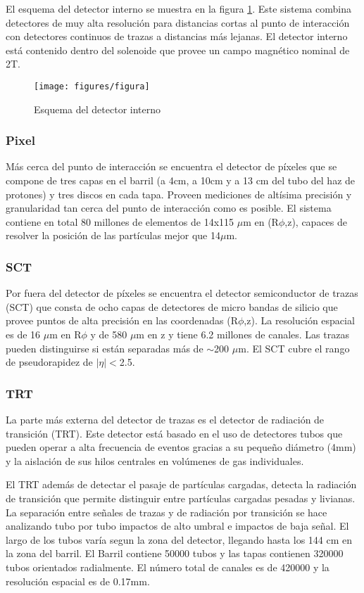 El esquema del detector interno se muestra en la figura \ref{fig:innerdetector}\cite{IDTDR}.
Este sistema combina detectores de muy alta resolución para distancias cortas al punto de interacción con detectores continuos de trazas a distancias más lejanas. El detector interno está contenido dentro del solenoide que provee un campo magnético nominal de 2T.

\begin{figure}[H]
  \centering
  \texttt{[image: figures/figura]}
  \caption{Esquema del detector interno}\label{fig:innerdetector}
\end{figure}

\subsubsection{Pixel}
Más cerca del punto de interacción se encuentra el detector de píxeles que se compone de tres capas en el barril (a 4cm, a 10cm y a 13 cm del tubo del haz de protones) y tres discos en cada tapa.  Proveen mediciones de altísima precisión y granularidad tan cerca del punto de interacción como es posible. El sistema contiene en total 80 millones de elementos de 14x115 $\mu$m en (R$\phi$,z), capaces de resolver la posición de las partículas mejor que 14$\mu$m.

\subsubsection{SCT}
Por fuera del detector de píxeles se encuentra el detector semiconductor de trazas (SCT) que consta de ocho capas de detectores de micro bandas de silicio que provee puntos de alta precisión en las coordenadas (R$\phi$,z).
La resolución espacial es de 16 $\mu$m en R$\phi$ y de 580 $\mu$m en z y tiene 6.2 millones de canales.
Las trazas pueden distinguirse si están separadas más de $\sim$200 $ \mu$m.
El SCT cubre el rango de pseudorapidez de $|\eta|<$2.5.


\subsubsection{TRT}
La parte más externa del detector de trazas es el detector de radiación de transición (TRT).
Este detector está basado en el uso de detectores tubos que pueden operar a alta frecuencia de eventos gracias a su pequeño diámetro (4mm) y la aislación de sus hilos centrales en volúmenes de gas individuales.

El TRT además de detectar el pasaje de partículas cargadas, detecta la radiación de transición que permite distinguir entre partículas cargadas pesadas y livianas.
La separación entre señales de trazas y de radiación por transición se hace analizando tubo por tubo impactos de alto umbral e impactos de baja señal.
El largo de los tubos varía segun la zona del detector, llegando hasta los 144 cm en la zona del barril.
El Barril contiene 50000 tubos y las tapas contienen 320000 tubos orientados radialmente. El número total de canales es de 420000 y la resolución espacial es de 0.17mm.


